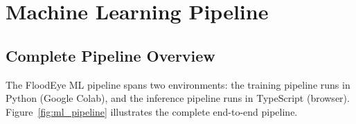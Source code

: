 \chapter{Machine Learning Pipeline}

\section{Complete Pipeline Overview}

The FloodEye ML pipeline spans two environments: the training pipeline runs in Python (Google Colab), and the inference pipeline runs in TypeScript (browser). Figure~\ref{fig:ml_pipeline} illustrates the complete end-to-end pipeline.

